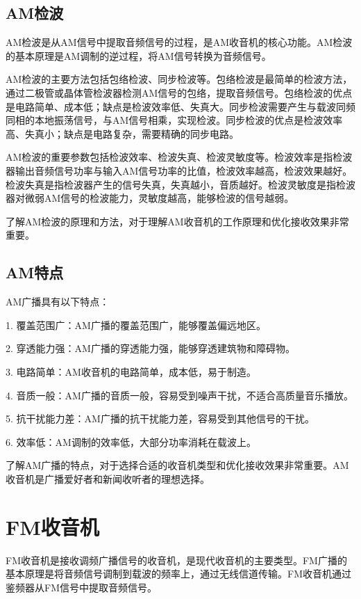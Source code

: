 \documentclass[12pt,UTF8]{ctexbook}
\begin{document}
\subsection{AM检波}

AM检波是从AM信号中提取音频信号的过程，是AM收音机的核心功能。AM检波的基本原理是AM调制的逆过程，将AM信号转换为音频信号。

AM检波的主要方法包括包络检波、同步检波等。包络检波是最简单的检波方法，通过二极管或晶体管检波器检测AM信号的包络，提取音频信号。包络检波的优点是电路简单、成本低；缺点是检波效率低、失真大。同步检波需要产生与载波同频同相的本地振荡信号，与AM信号相乘，实现检波。同步检波的优点是检波效率高、失真小；缺点是电路复杂，需要精确的同步电路。

AM检波的重要参数包括检波效率、检波失真、检波灵敏度等。检波效率是指检波器输出音频信号功率与输入AM信号功率的比值，检波效率越高，检波效果越好。检波失真是指检波器产生的信号失真，失真越小，音质越好。检波灵敏度是指检波器对微弱AM信号的检波能力，灵敏度越高，能够检波的信号越弱。

了解AM检波的原理和方法，对于理解AM收音机的工作原理和优化接收效果非常重要。

\subsection{AM特点}

AM广播具有以下特点：

1. 覆盖范围广：AM广播的覆盖范围广，能够覆盖偏远地区。

2. 穿透能力强：AM广播的穿透能力强，能够穿透建筑物和障碍物。

3. 电路简单：AM收音机的电路简单，成本低，易于制造。

4. 音质一般：AM广播的音质一般，容易受到噪声干扰，不适合高质量音乐播放。

5. 抗干扰能力差：AM广播的抗干扰能力差，容易受到其他信号的干扰。

6. 效率低：AM调制的效率低，大部分功率消耗在载波上。

了解AM广播的特点，对于选择合适的收音机类型和优化接收效果非常重要。AM收音机是广播爱好者和新闻收听者的理想选择。

\section{FM收音机}

FM收音机是接收调频广播信号的收音机，是现代收音机的主要类型。FM广播的基本原理是将音频信号调制到载波的频率上，通过无线信道传输。FM收音机通过鉴频器从FM信号中提取音频信号。
\end{document}
